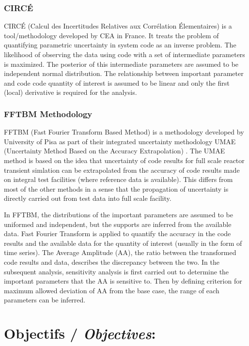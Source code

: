 \documentclass[11pt,titlepage]{article}
\begin{document}
\subsubsection{CIRCÉ}

CIRCÉ (Calcul des Incertitudes Relatives aux Corrélation Élementaires) is a tool/methodology developed by CEA in France. It treats the problem of quantifying parametric uncertainty in system code as an inverse problem. The likelihood of observing the data using code with a set of intermediate parameters is maximized. The posterior of this intermediate parameters are assumed to be independent normal distribution. The relationship between important parameter and code code quantity of interest is assumed to be linear and only the first (local) derivative is required for the analysis.

\subsubsection{FFTBM Methodology}

FFTBM (Fast Fourier Transform Based Method) is a methodology developed by University of Pisa as part of their integrated uncertainty methodology UMAE (Uncertainty Method Based on the Accuracy Extrapolation) \cite{Prosek2002,DAuria1998}. The UMAE method is based on the idea that uncertainty of code results for full scale reactor transient simlation can be extrapolated from the accuracy of code results made on integral test facilities (where reference data is available). This differs from most of the other methods in a sense that the propagation of uncertainty is directly carried out from test data into full scale facility.

In FFTBM, the distributions of the important parameters are assumed to be uniformed and independent, but the supports are inferred from the available data. Fast Fourier Transform is applied to quantify the accuracy in the code results and the available data for the quantity of interest (usually in the form of time series). The Average Amplitude (AA), the ratio between the transformed code results and data, describes the discrepancy between the two. In the subsequent analysis, sensitivity analysis is first carried out to determine the important parameters that the AA is sensitive to. Then by defining criterion for maximum allowed deviation of AA from the base case, the range of each parameters can be inferred.

\newpage
\section{Objectifs /  {\large\textit{Objectives}}:}
\end{document}
